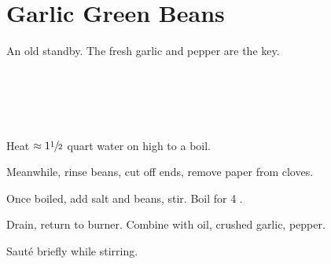 \section[Green Beans]{Garlic Green Beans}

\begin{recipestats}[
        servings=2,
        preptime=10~\minute,
        bakingtime=5~\minute,
        source=Mike Teresi,
        original=Pamela Teresi
    ]
\end{recipestats}

\begin{recipeabstract}
    An old standby.
    The fresh garlic and pepper are the key.
\end{recipeabstract}

\begin{ingredientcolumns}
    \begin{ingredientblock}
        \\
    \end{ingredientblock}
    \begin{ingredientblock}
        \\
        \\
    \end{ingredientblock}
\end{ingredientcolumns}

\begin{preparation}
\item Heat $\approx 1 \sfrac{1}{2}$ quart water on high to a boil.
\item Meanwhile, rinse beans, cut off ends, remove paper from cloves.
\item Once boiled, add salt and beans, stir.
    Boil for 4 \minute.
\item Drain, return to burner.
    Combine with oil, crushed garlic, pepper.
\item Saut\'{e} briefly while stirring.
\end{preparation}

\recipeend%
